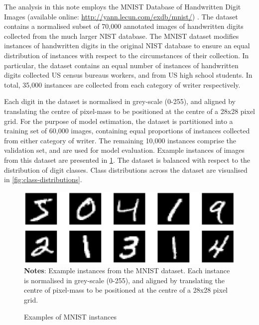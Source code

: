 
The analysis in this note employs the MNIST Database of Handwritten Digit Images (available online: \url{http://yann.lecun.com/exdb/mnist/}) \cite{lecun1998gradient}. The dataset contains a normalised subset of 70,000 annotated images of handwritten digits collected from the much larger NIST database.
The MNIST dataset modifies instances of handwritten digits in the original NIST database to ensure an equal distribution of instances with respect to the circumstances of their collection.
In particular, the dataset contains an equal number of instances of handwritten digits collected US census bureaus workers, and from US high school students. In total, 35,000 instances are collected from each category of writer respectively.

Each digit in the dataset is normalised in grey-scale (0-255), and aligned by translating the centre of pixel-mass to be positioned at the centre of a 28x28 pixel grid. 
For the purpose of model estimation, the dataset is partitioned into a training set of 60,000 images, containing equal proportions of instances collected from either category of writer.
The remaining 10,000 instances comprise the validation set, and are used for model evaluation.
Example instances of images from this dataset are presented in \ref{fig:instance-examples}.
The dataset is balanced with respect to the distribution of digit classes. Class distributions across the dataset are visualised in \ref{fig:class-distributions}.

\begin{figure}
    \caption{Examples of MNIST instances}
	\label{fig:instance-examples}
	\includegraphics[width=1.0\textwidth]{graphics/instance_examples.pdf}
    \textbf{Notes}: Example instances from the MNIST dataset. Each instance is normalised in grey-scale (0-255), and aligned by translating the centre of pixel-mass to be positioned at the centre of a 28x28 pixel grid. 
\end{figure}

